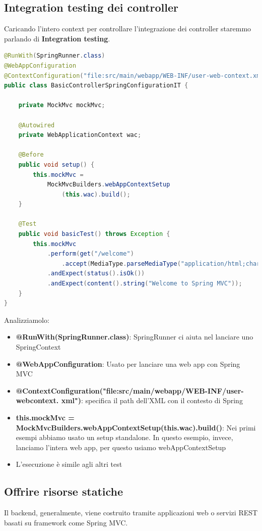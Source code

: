 \documentclass[11pt,a4paper]{book}
\begin{document}
\subsection{Integration testing dei controller}
Caricando l'intero context per controllare l'integrazione dei controller staremmo parlando di \textbf{Integration testing}.
\begin{lstlisting}[language = Java]
@RunWith(SpringRunner.class)
@WebAppConfiguration
@ContextConfiguration("file:src/main/webapp/WEB-INF/user-web-context.xml")
public class BasicControllerSpringConfigurationIT {
	
	private MockMvc mockMvc;

	@Autowired
	private WebApplicationContext wac;

	@Before
	public void setup() {
		this.mockMvc =
			MockMvcBuilders.webAppContextSetup
				(this.wac).build();
	}

	@Test
	public void basicTest() throws Exception {
		this.mockMvc
			.perform(get("/welcome")
				.accept(MediaType.parseMediaType("application/html;charset=UTF-8")))
			.andExpect(status().isOk())
			.andExpect(content().string("Welcome to Spring MVC"));
	}
}
\end{lstlisting}

Analizziamolo:
\begin{itemize}
	\item \textbf{@RunWith(SpringRunner.class)}: SpringRunner ci aiuta nel lanciare uno SpringContext
	\item \textbf{@WebAppConfiguration}: Usato per lanciare una web app con Spring MVC
	\item \textbf{@ContextConfiguration("file:src/main/webapp/WEB-INF/user-webcontext.
xml")}: specifica il path dell'XML con il contesto di Spring
	\item \textbf{this.mockMvc =
MockMvcBuilders.webAppContextSetup(this.wac).build()}: Nei primi esempi abbiamo usato un setup standalone. In questo esempio, invece, lanciamo l'intera web app, per questo usiamo webAppContextSetup
	\item  L'esecuzione è simile agli altri test
\end{itemize}

\subsection{Offrire risorse statiche}
Il backend, generalmente, viene costruito tramite applicazioni web o servizi REST basati su framework come Spring MVC.
\end{document}
